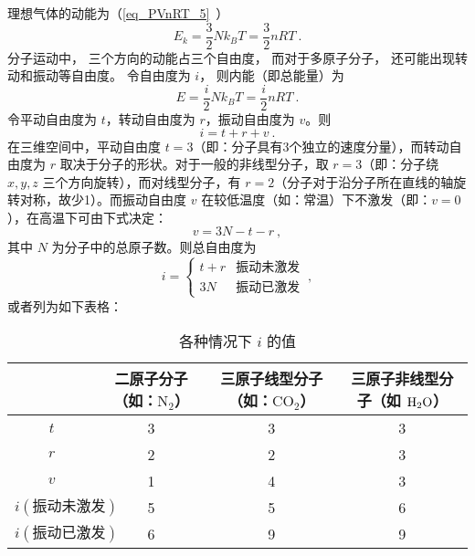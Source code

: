 
\begin{issues}
\issueDraft
\end{issues}


理想气体的动能为（\autoref{eq_PVnRT_5}~）
\begin{equation}
E_k = \frac32 Nk_B T = \frac{3}{2}nRT~.
\end{equation}
分子运动中， 三个方向的动能占三个自由度， 而对于多原子分子， 还可能出现转动和振动等自由度。 令自由度为 $i$， 则内能（即总能量）为
\begin{equation}\label{eq_IdgEng_1}
E = \frac{i}{2}Nk_B T = \frac{i}{2}nRT~.
\end{equation}
令平动自由度为 $t$，转动自由度为 $r$，振动自由度为 $v$。则
\begin{equation}
i=t+r+v~.
\end{equation}
在三维空间中，平动自由度 $t=3$（即：分子具有3个独立的速度分量），而转动自由度为 $r$ 取决于分子的形状。对于一般的非线型分子，取 $r=3$（即：分子绕 $x,y,z$ 三个方向旋转），而对线型分子，有 $r=2$（分子对于沿分子所在直线的轴旋转对称，故少1）。而振动自由度 $v$ 在较低温度（如：常温）下不激发（即：$v=0$），在高温下可由下式决定：
\begin{equation}
v=3N-t-r~,
\end{equation}
其中 $N$ 为分子中的总原子数。则总自由度为
\begin{equation}
i=\left\{\begin{matrix}{t+r}&{\text{振动未激发}}\\{3N}&{\text{振动已激发}}\end{matrix}\right.~,
\end{equation}
或者列为如下表格：\begin{table}[ht]
\centering
\caption{各种情况下 $i$ 的值}\label{tab_IdgEng_1}
\begin{tabular}{|c|c|c|c|}
\hline
 & 二原子分子（如：$\text{N}_2$） & 三原子线型分子（如：$\text{CO}_2$） & 三原子非线型分子（如 $\text H_2\text O$） \\
\hline
$t$ & 3 & 3 & 3 \\
\hline
$r$ & 2 & 2 & 3 \\
\hline
$v$ & 1 & 4 & 3 \\
\hline
$i(\text{振动未激发})$ & 5 & 5 & 6 \\
\hline
$i(\text{振动已激发})$ & 6 & 9 & 9 \\
\hline
\end{tabular}
\end{table}
